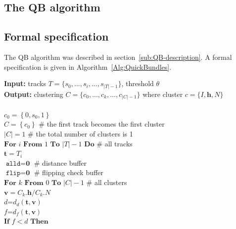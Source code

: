 \documentclass[preprint,authoryear,a4paper,10pt,onecolumn]{elsarticle}
\begin{document}
\begin{appendices}

\section{The QB algorithm\label{Sec:QB-Algorithm}}

\subsection{Formal specification\label{sub:QB-specification}}

The QB algorithm was described in section~\ref{sub:QB-description}. A formal
specification is given in Algorithm~\ref{Alg:QuickBundles}.

\begin{algorithm}
\textbf{Input:} tracks $T=\{s_{0},...,s_{i},...,s_{|T|-1}\}$, threshold $\theta $\\
\textbf{Output:} clustering $C=\{c_{0},...,c_{k},...,c_{|C|-1}\}$ where cluster $c=\{I,\mathbf{h},N\}$\\
\\
$c_{0}=\left\{0,s_{0},1\right\}$\\
$C=\left\{c_{0}\right\}$ \# the first track becomes the first cluster\\
$|C|=1$ \# the total number of clusters is 1 \\
$\textbf{For}$ $i$ $\textbf{From}$ $1$ $\textbf{To}$ $|T|-1$ $\textbf{Do}$ \# all tracks\\
\hspace*{2em} $\textbf{t}=T_{i}$\\
\hspace*{2em} $\texttt{alld}=\textbf{0}$ \# distance buffer\\
\hspace*{2em} $\texttt{flip}=\textbf{0}$ \# flipping check buffer\\
\hspace*{2em} $\textbf{For}$ $k$ $\textbf{From}$ $0$ $\textbf{To}$ $|C|-1$ \# all clusters\\
\hspace*{4em} $\mathbf{v}=C_{k}.\mathbf{h}/C_{k}.N$\\ 
\hspace*{4em} $d$=$d_{d}(\mathbf{t},\mathbf{v})$\\
\hspace*{4em} $f$=$d_{f}(\mathbf{t},\mathbf{v})$\\
\hspace*{4em} $\textbf{If}$ $f < d$ $\textbf{Then}$\\

\end{algorithm}
\end{appendices}
\end{document}
